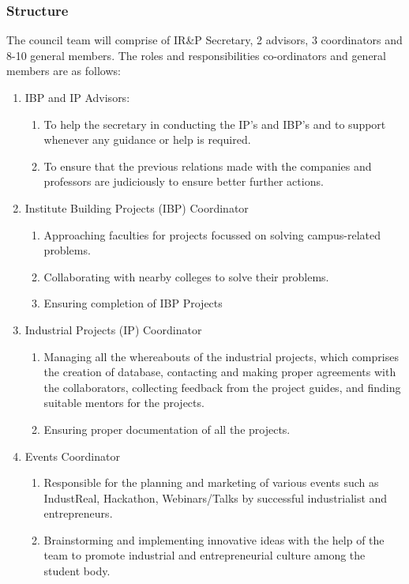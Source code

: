 \documentclass[12pt]{article}
\begin{document}
\subsubsection{Structure}
The council team will comprise of IR\&P Secretary, 2 advisors, 3 coordinators and 8-10 general members. The roles and responsibilities co-ordinators and general members are as follows:
\begin{enumerate}
    \item IBP and IP Advisors:
    \begin{enumerate}
        \item To help the secretary in conducting the IP’s and IBP’s and to support whenever any guidance or help is required.
        \item To ensure that the previous relations made with the companies and professors are judiciously to ensure better further actions.
    \end{enumerate}
    \item Institute Building Projects (IBP) Coordinator
    \begin{enumerate}
        \item Approaching faculties for projects focussed on solving campus-related problems.
        \item Collaborating with nearby colleges to solve their problems.
        \item Ensuring completion of IBP Projects
    \end{enumerate}
    \item Industrial Projects (IP) Coordinator
    \begin{enumerate}
        \item Managing all the whereabouts of the industrial projects, which comprises the creation of database, contacting and making proper agreements with the collaborators, collecting feedback from the project guides, and finding suitable mentors for the projects.
        \item Ensuring proper documentation of all the projects.
    \end{enumerate}
    \item Events Coordinator
    \begin{enumerate}
        \item Responsible for the planning and marketing of various events such as IndustReal, Hackathon, Webinars/Talks by successful industrialist and entrepreneurs.
        \item Brainstorming and implementing innovative ideas with the help of the team to promote industrial and entrepreneurial culture among the student body.

\end{enumerate}
\end{enumerate}
\end{document}

